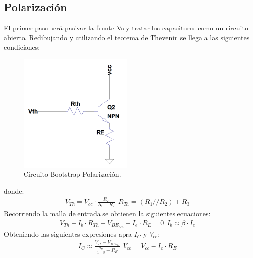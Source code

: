 \documentclass[a4paper]{article}
\begin{document}
\subsection{Polarización}
El primer paso será pasivar la fuente Vs y tratar los capacitores como un circuito abierto. Redibujando y utilizando el teorema de Thevenin se llega a las siguientes condiciones:
\begin{figure} [H]
	\centering
	\includegraphics[width=0.5\textwidth]{imagenes/polarizacion.PNG}
	\caption{Circuito Bootstrap Polarización.}
	\label{fig:pol}
\end{figure}
donde:
\begin{align} V_{Th}= V_{cc}\cdot \frac{R_2}{R_1+R_2} \ \ R_{Th}= (R_1 // R_2) +R_3\end{align}
Recorriendo la malla de entrada se obtienen la siguientes ecuaciones:
\begin{align} V_{Th}-I_b \cdot R_{Th} -V_{BE_{On}}-I_e \cdot R_E=0  \ \  I_b\approx  \beta \cdot I_e\end{align}
Obteniendo las siguientes expresiones apra $I_C$ y $V_{ce}$:
\begin{align} I_{C}\approx \frac{V_{Th}-V_{BE_{On}}}{\frac{R_{Th}}{1+\beta}+R_E} \ \ V_{ce}= V_{cc}-I_c\cdot R_E\end{align}
\end{document}
